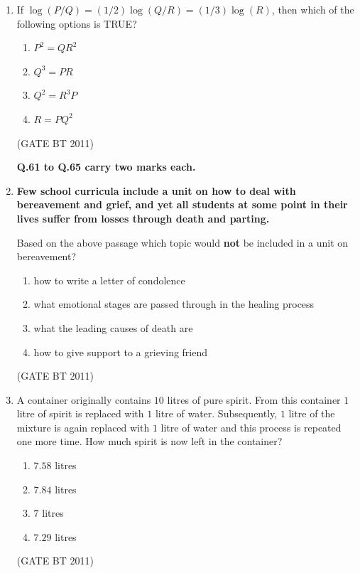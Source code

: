 \documentclass[journal,12pt,onecolumn]{IEEEtran}
\begin{document}
\begin{enumerate}
  \item If $\log (P/Q) = (1/2) \log(Q/R) = (1/3)\log(R)$, then which of the following options is TRUE?

  \begin{multicols}{4}
    \begin{enumerate}
      \item $P^2 = Q R^2$
      \item $Q^3 = P R$
      \item $Q^2 = R^3 P$
      \item $R = P Q^2$
    \end{enumerate}
  \end{multicols} \hfill(GATE BT 2011)

\textbf{Q.61 to Q.65 carry two marks each.}
 

\item \textbf{ Few school curricula include a unit on how to deal with bereavement and grief, 
and yet all students at some point in their lives suffer from losses through death and parting.} 

Based on the above passage which topic would \textbf{not} be included in a unit on bereavement?

  \begin{enumerate}
    \item how to write a letter of condolence
    \item what emotional stages are passed through in the healing process
    \item what the leading causes of death are
    \item how to give support to a grieving friend
  \end{enumerate}
 \hfill(GATE BT 2011)

\item A container originally contains $10$ litres of pure spirit. 
From this container $1$ litre of spirit is replaced with $1$ litre of water. 
Subsequently, $1$ litre of the mixture is again replaced with $1$ litre of water 
and this process is repeated one more time. 
How much spirit is now left in the container?

\begin{multicols}{4}
  \begin{enumerate}
    \item $7.58$ litres
    \item $7.84$ litres
    \item $7$ litres
    \item $7.29$ litres
  \end{enumerate}
\end{multicols} \hfill(GATE BT 2011)


\end{enumerate}
\end{document}
